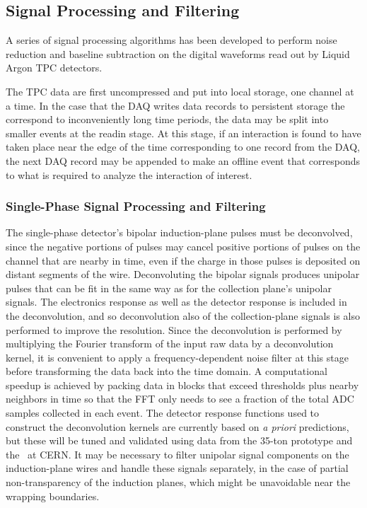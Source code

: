 \subsection{Signal Processing and Filtering}
\label{annex:reconstruction-signal-proc}

A series of signal processing algorithms has been developed to
perform noise reduction and baseline subtraction on the digital
waveforms read out by Liquid Argon TPC detectors. 

The TPC data are first uncompressed and put into local storage, one channel at a time.  
In the case that the DAQ writes data records to persistent
storage the correspond to inconveniently long time periods, the data may be split
into smaller events at the readin stage.  At this stage, if an interaction is found
to have taken place near the edge of the time corresponding to one record from the DAQ,
the next DAQ record may be appended to make an offline event that corresponds to
what is required to analyze the interaction of interest.

\subsubsection{Single-Phase Signal Processing and Filtering}

The single-phase detector's bipolar induction-plane pulses must be deconvolved,
since the negative portions of pulses may cancel positive portions of pulses on the channel
that are nearby in time, even if the charge in those pulses is deposited on distant segments
of the wire.  Deconvoluting the bipolar signals produces unipolar pulses that can be fit in the
same way as for the collection plane's unipolar signals.  
The electronics response as well as the detector response is included in the
deconvolution, and so deconvolution also of the collection-plane signals is also performed to improve
the resolution.   Since the deconvolution is performed by multiplying the Fourier transform of the
input raw data by a deconvolution kernel, it is convenient to apply a frequency-dependent noise filter
at this stage before transforming the data back into the time domain.
A computational speedup is achieved by packing data in
blocks that exceed thresholds plus nearby neighbors in time so that
the FFT only needs to see a fraction of the total ADC samples
collected in each event.
The detector response functions used to construct the deconvolution kernels are currently
based on \textit{a priori} predictions, but these will be tuned and
validated using data from the 35-ton prototype and the~\cernsingleproto{} at CERN.
It may be necessary to filter unipolar signal components on the induction-plane
wires and handle these signals separately, in the case of partial
non-transparency of the induction planes, which might be unavoidable
near the wrapping boundaries.  

